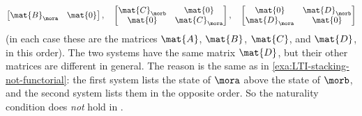 \begin{example}
\begin{equation}
\begin{bmatrix}
            \mat{B}_\mora & \mat{0}
        \end{bmatrix},
        \quad
        \begin{bmatrix}
            \mat{C}_\morb & \mat{0}       \\
            \mat{0}       & \mat{C}_\mora
        \end{bmatrix},
        \quad
        \begin{bmatrix}
            \mat{0}       & \mat{D}_\morb \\
            \mat{D}_\mora & \mat{0}
        \end{bmatrix}
    \end{equation}
    (in each case these are the matrices $\mat{A}$, $\mat{B}$, $\mat{C}$, and $\mat{D}$, in this order).
    The two systems have the same matrix $\mat{D}$, but their other matrices are different in general.
    The reason is the same as in \cref{exa:LTI-stacking-not-functorial}: the first system lists the state of $\mora$ above the state of $\morb$, and the second system lists them in the opposite order.
    So the naturality condition does \emph{not} hold in \LTI.


\end{example}
